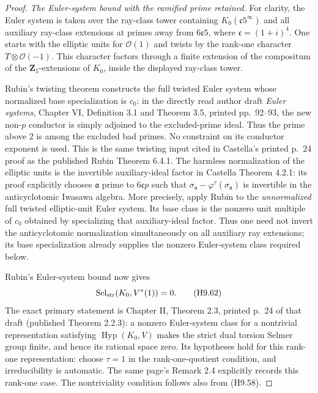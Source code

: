 \begin{proof}
\emph{The Euler-system bound with the ramified prime retained.}
For clarity, the Euler system is taken over the ray-class tower
containing $K_0(\mathfrak c5^\infty)$ and all auxiliary ray-class
extensions at primes away from $6\mathfrak c5$, where
$\mathfrak c=(1+i)^4$. One starts with the elliptic units for
$\mathcal O(1)$ and twists by the rank-one character
$T\otimes\mathcal O(-1)$. This character factors through a finite
extension of the compositum of the $\mathbf Z_5$-extensions of
$K_0$, inside the displayed ray-class tower.

Rubin's twisting theorem constructs the full twisted Euler system
whose normalized base specialization is $c_0$: in the directly read author draft
\emph{Euler systems}, Chapter VI, Definition 3.1 and Theorem 3.5,
printed pp.~92--93, the new non-$p$ conductor is simply adjoined
to the excluded-prime ideal. Thus the prime above $2$ is among
the excluded bad primes. No constraint on its conductor exponent
is used. This is the same twisting input cited in Castella's
printed p.~24 proof as the published Rubin Theorem 6.4.1.
The harmless normalization of the elliptic units is the invertible
auxiliary-ideal factor in Castella Theorem 4.2.1: its proof explicitly
chooses $\mathfrak a$ prime to $6\mathfrak cp$ such that
$\sigma_{\mathfrak a}-\varphi^\tau(\sigma_{\mathfrak a})$
is invertible in the anticyclotomic Iwasawa algebra. More precisely,
apply Rubin to the \emph{unnormalized} full twisted elliptic-unit
Euler system. Its base class is the nonzero unit multiple of $c_0$
obtained by specializing that auxiliary-ideal factor. Thus one need
not invert the anticyclotomic normalization simultaneously on all
auxiliary ray extensions; its base specialization already supplies
the nonzero Euler-system class required below.

Rubin's Euler-system bound now gives
\[
           \operatorname{Sel}_{\rm str}(K_0,V^*(1))=0.
                                                               \tag{H9.62}
\]
The exact primary statement is Chapter II, Theorem 2.3, printed
p.~24 of that draft (published Theorem 2.2.3): a nonzero
Euler-system class for a nontrivial representation satisfying
$\operatorname{Hyp}(K_0,V)$ makes the strict dual torsion Selmer
group finite, and hence its rational space zero. Its hypotheses
hold for this rank-one representation: choose $\tau=1$ in the
rank-one-quotient condition, and irreducibility is automatic.
The same page's Remark 2.4 explicitly records this rank-one case.
The nontriviality condition follows also from (H9.58).


\end{proof}
